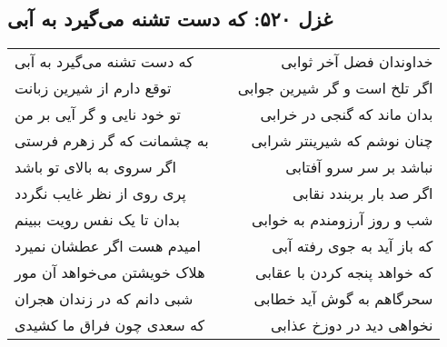 \begin{center}
\section*{غزل ۵۲۰: که دست تشنه می‌گیرد به آبی}
\label{sec:520}
\begin{longtable}{l p{0.5cm} r}
که دست تشنه می‌گیرد به آبی
&&
خداوندان فضل آخر ثوابی
\\
توقع دارم از شیرین زبانت
&&
اگر تلخ است و گر شیرین جوابی
\\
تو خود نایی و گر آیی بر من
&&
بدان ماند که گنجی در خرابی
\\
به چشمانت که گر زهرم فرستی
&&
چنان نوشم که شیرینتر شرابی
\\
اگر سروی به بالای تو باشد
&&
نباشد بر سر سرو آفتابی
\\
پری روی از نظر غایب نگردد
&&
اگر صد بار بربندد نقابی
\\
بدان تا یک نفس رویت ببینم
&&
شب و روز آرزومندم به خوابی
\\
امیدم هست اگر عطشان نمیرد
&&
که باز آید به جوی رفته آبی
\\
هلاک خویشتن می‌خواهد آن مور
&&
که خواهد پنجه کردن با عقابی
\\
شبی دانم که در زندان هجران
&&
سحرگاهم به گوش آید خطابی
\\
که سعدی چون فراق ما کشیدی
&&
نخواهی دید در دوزخ عذابی
\\
\end{longtable}
\end{center}
